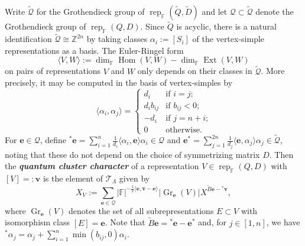 \documentclass[pdftex]{sigma}
\newcommand{\bfe}{\mathbf{e}}
\newcommand{\bfv}{\mathbf{v}}
\newcommand{\cQ}{\mathcal{Q}}
\newcommand{\cT}{\mathcal{T}}
\newcommand{\FF}{\mathbb{F}}
\newcommand{\Ext}{\operatorname{Ext}}
\newcommand{\Gr}{\operatorname{Gr}}
\newcommand{\half}{{\frac{1}{2}}}
\newcommand{\Hom}{\operatorname{Hom}}
\newcommand{\rep}{\operatorname{rep}}
\newcommand{\ZZ}{\mathbb{Z}}
\newcommand{\newword}[1]{\textbf{\emph{#1}}}
\begin{document}
  Write $\widetilde{\cQ}$ for the Grothendieck group of $\rep_\FF(\widetilde{Q},\widetilde{D})$ and let $\cQ\subset\widetilde{\cQ}$ denote the Grothendieck group of $\rep_\FF(Q,D)$.
  Since $\widetilde{Q}$ is acyclic, there is a natural identification $\widetilde{\cQ}\cong\ZZ^{2n}$ by taking classes $\alpha_i:=[S_i]$ of the vertex-simple representations as a basis.
  The Euler-Ringel form
  \[
    \langle V,W\rangle:=\dim_\FF\Hom(V,W)-\dim_\FF\Ext(V,W)
  \]
  on pairs of representations $V$ and $W$ only depends on their classes in $\widetilde{\cQ}$.  
  More precisely, it may be computed in the basis of vertex-simples by
  \[
    \langle\alpha_i,\alpha_j\rangle
    =
    \begin{cases} 
      d_i & \text{if $i=j$;}\\
      d_ib_{ij} & \text{if $b_{ij}<0$;}\\
      -d_i & \text{if $j=n+i$;}\\
      0 & \text{otherwise.}
    \end{cases}
  \]
  For $\bfe\in\cQ$, define ${}^*\bfe=\sum\limits_{i=1}^n\frac{1}{d_i}\langle\alpha_i,\bfe\rangle\alpha_i\in\cQ$ and $\bfe^*=\sum\limits_{j=1}^{2n}\frac{1}{d_j}\langle\bfe,\alpha_j\rangle\alpha_j\in\widetilde{\cQ}$, noting that these do not depend on the choice of symmetrizing matrix $D$. 
  Then the \newword{quantum cluster character} of a representation $V\in\rep_\FF(Q,D)$ with $[V]=:\bfv$ is the element of $\cT_\Lambda$  given by 
  \[
    X_V
    :=
    \sum\limits_{\bfe\in\cQ} |\FF|^{-\half\langle\bfe,\bfv-\bfe\rangle}\big|\!\Gr_\bfe(V)\big|X^{\widetilde{B}\bfe-{}^*\bfv},
  \] 
  where $\Gr_\bfe(V)$ denotes the set of all subrepresentations $E\subset V$ with isomorphism class $[E]=\bfe$.  
  Note that $\widetilde{B}\bfe={}^*\bfe-\bfe^*$ and, for $j\in[1,n]$, we have ${}^*\alpha_j=\alpha_j+\sum\limits_{i=1}^{n}\min(b_{ij},0)\alpha_i$.
\end{document}
